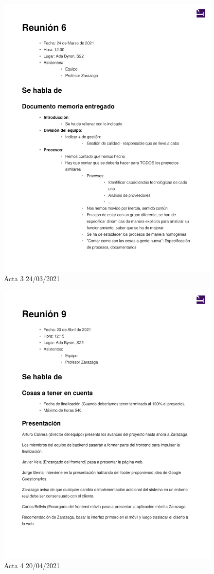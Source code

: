 \documentclass{article}
\begin{document}
\begin{figure}[H]
   \includegraphics[width=.8\textwidth]{../../actas_reuniones/2021.03.24_3_Actas.pdf}
   \caption{Acta 3 24/03/2021}
\end{figure}
\begin{figure}[H]
   \includegraphics[width=.8\textwidth]{../../actas_reuniones/2021.04.20_4_Actas.pdf}
   \caption{Acta 4 20/04/2021}
\end{figure}
\end{document}
